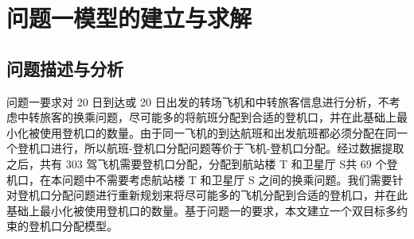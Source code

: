 \documentclass[bwprint]{gmcmthesis}
\numberwithin{figure}{section}
\begin{document}
\section{问题一模型的建立与求解}
\subsection{问题描述与分析}
问题一要求对 20 日到达或 20 日出发的转场飞机和中转旅客信息进行分析，不考虑中转旅客的换乘问题，尽可能多的将航班分配到合适的登机口，并在此基础上最小化被使用登机口的数量。由于同一飞机的到达航班和出发航班都必须分配在同一个登机口进行，所以航班-登机口分配问题等价于飞机-登机口分配。经过数据提取之后，共有 303 驾飞机需要登机口分配，分配到航站楼 T 和卫星厅 S共 69 个登机口，在本问题中不需要考虑航站楼 T 和卫星厅 S 之间的换乘问题。我们需要针对登机口分配问题进行重新规划来将尽可能多的飞机分配到合适的登机口，并在此基础上最小化被使用登机口的数量。基于问题一的要求，本文建立一个双目标多约束的登机口分配模型。
\end{document}
